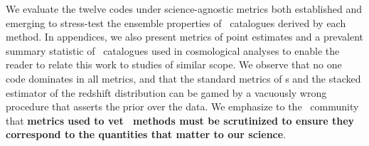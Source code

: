 We evaluate the twelve codes under science-agnostic metrics both established and emerging to stress-test the ensemble properties of \pzpdf\ catalogues derived by each method.
In appendices, we also present metrics of point estimates and a prevalent summary statistic of \pzpdf\ catalogues used in cosmological analyses to enable the reader to relate this work to studies of similar scope.
We observe that no one code dominates in all metrics, and that the standard metrics of \pzpdf s and the stacked estimator of the redshift distribution can be gamed by a vacuously wrong procedure that asserts the prior over the data.
We emphasize to the \pz\ community that \textbf{metrics used to vet \pzpdf\ methods must be scrutinized to ensure they correspond to the quantities that matter to our science}.


